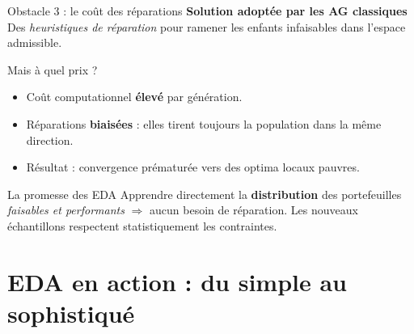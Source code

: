 \documentclass[10pt,aspectratio=169]{beamer}
\begin{document}
\begin{frame}{Obstacle 3 : le coût des réparations}
\textbf{Solution adoptée par les AG classiques}\\[0.1cm]
Des \emph{heuristiques de réparation} pour ramener les enfants infaisables dans l'espace admissible.

\vspace{0.3cm}
\begin{alertblock}{Mais à quel prix ?}
\begin{itemize}
  \item Coût computationnel \textbf{élevé} par génération.
  \item Réparations \textbf{biaisées} : elles tirent toujours la population dans la même direction.
  \item Résultat : \textcolor{dangerred}{convergence prématurée} vers des optima locaux pauvres.
\end{itemize}
\end{alertblock}

\vspace{0.3cm}
\begin{exampleblock}{La promesse des EDA}
Apprendre directement la \textbf{distribution} des portefeuilles \emph{faisables et performants} $\Rightarrow$ aucun besoin de réparation. Les nouveaux échantillons respectent statistiquement les contraintes.
\end{exampleblock}
\end{frame}

\section{EDA en action : du simple au sophistiqué}
\end{document}
